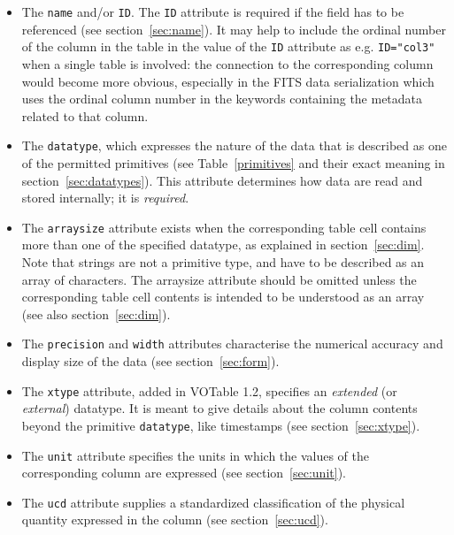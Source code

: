 \documentclass[11pt,a4paper]{ivoa}
\def\Aref#1{section~\ref{#1}}
\def\Tref#1{Table~\ref{#1}}
\let\fg=\color
\def\attr#1{{\tt{\fg{DarkRed}#1}}}
\def\attrval#1#2{{\tt{\fg{DarkRed}#1}="{\fg{DarkPurple}#2}"}}
\begin{document}
\begin{itemize}
\item   The \attr{name} and/or \attr{ID}. The \attr{ID} attribute is required
        if the field has to be referenced (see
        \Aref{sec:name}).
        It may help to include the ordinal number of
        the column in the table in the value of the \attr{ID} attribute
        as e.g. \attrval{ID}{col3} when a single table is involved:
        the connection to the
        corresponding column would become
        more obvious, especially in the FITS data serialization
        which uses the ordinal column number in the keywords containing
        the metadata related to that column.

\item   The \attr{datatype}, which expresses the nature of the data
        that is described as one of the permitted primitives
        (see \Tref{primitives} and their exact meaning
        in \Aref{sec:datatypes}).
        This attribute determines
        how data are read and stored internally;
        it is {\em required}.

\item   The \attr{arraysize} attribute exists when
        the corresponding table cell contains more than one of the specified
        datatype, as explained in \Aref{sec:dim}.
        Note that strings are not a primitive type,
        and have to be described as an array of characters.  The
        arraysize attribute should be omitted unless the corresponding
        table cell contents is intended to be understood as an array
        (see also \Aref{sec:dim}).

\item   {\fg{black}}The \attr{precision} and \attr{width} attributes
        characterise the numerical accuracy and display size
        of the data
        (see \Aref{sec:form}).

\item	The \attr{xtype} attribute, added in VOTable 1.2, specifies an
	{\em extended} (or {\em external}) datatype. It is meant
	to give details about the column contents beyond the
	primitive \attr{datatype}, like timestamps
        (see \Aref{sec:xtype}).

\item   The \attr{unit} attribute specifies the units in which
        the values of the corresponding column are expressed
        (see \Aref{sec:unit}).

\item   The \attr{ucd} attribute supplies a standardized classification
        of the physical quantity expressed in the column
        (see \Aref{sec:ucd}).


\end{itemize}
\end{document}
